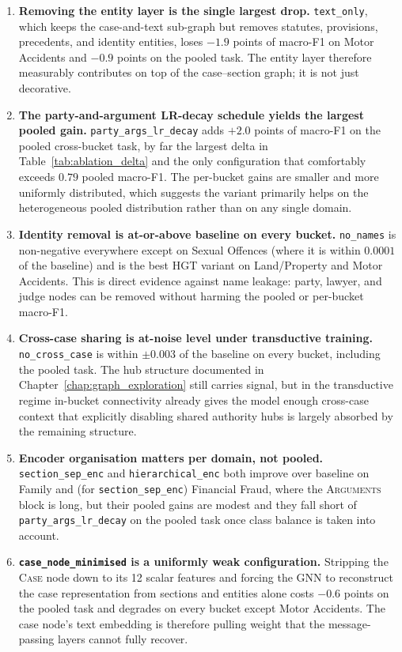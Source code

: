 \begin{enumerate}
  \item \textbf{Removing the entity layer is the single largest
    drop.} \texttt{text\_only}, which keeps the case-and-text
    sub-graph but removes statutes, provisions, precedents, and
    identity entities, loses $-1.9$ points of macro-F1 on Motor
    Accidents and $-0.9$ points on the pooled task. The entity layer
    therefore measurably contributes on top of the case--section
    graph; it is not just decorative.
  \item \textbf{The party-and-argument LR-decay schedule yields the
    largest pooled gain.} \texttt{party\_args\_lr\_decay} adds
    $+2.0$ points of macro-F1 on the pooled cross-bucket task, by
    far the largest delta in Table~\ref{tab:ablation_delta} and the
    only configuration that comfortably exceeds $0.79$ pooled
    macro-F1. The per-bucket gains are smaller and more
    uniformly distributed, which suggests the variant primarily
    helps on the heterogeneous pooled distribution rather than on
    any single domain.
  \item \textbf{Identity removal is at-or-above baseline on every
    bucket.} \texttt{no\_names} is non-negative everywhere except
    on Sexual Offences (where it is within $0.0001$ of the baseline)
    and is the best HGT variant on Land/Property and Motor
    Accidents. This is direct evidence against name leakage: party,
    lawyer, and judge nodes can be removed without harming the
    pooled or per-bucket macro-F1.
  \item \textbf{Cross-case sharing is at-noise level under
    transductive training.} \texttt{no\_cross\_case} is within
    $\pm 0.003$ of the baseline on every bucket, including the
    pooled task. The hub structure documented in
    Chapter~\ref{chap:graph_exploration} still carries signal, but
    in the transductive regime in-bucket connectivity already gives
    the model enough cross-case context that explicitly disabling
    shared authority hubs is largely absorbed by the remaining
    structure.
  \item \textbf{Encoder organisation matters per domain, not pooled.}
    \texttt{section\_sep\_enc} and \texttt{hierarchical\_enc} both
    improve over baseline on Family and (for
    \texttt{section\_sep\_enc}) Financial Fraud, where the
    \textsc{Arguments} block is long, but their pooled gains are
    modest and they fall short of \texttt{party\_args\_lr\_decay} on
    the pooled task once class balance is taken into account.
  \item \textbf{\texttt{case\_node\_minimised} is a uniformly weak
    configuration.} Stripping the \textsc{Case} node down to its 12
    scalar features and forcing the GNN to reconstruct the case
    representation from sections and entities alone costs $-0.6$
    points on the pooled task and degrades on every bucket except
    Motor Accidents. The case node's text embedding is therefore
    pulling weight that the message-passing layers cannot fully
    recover.
\end{enumerate}

